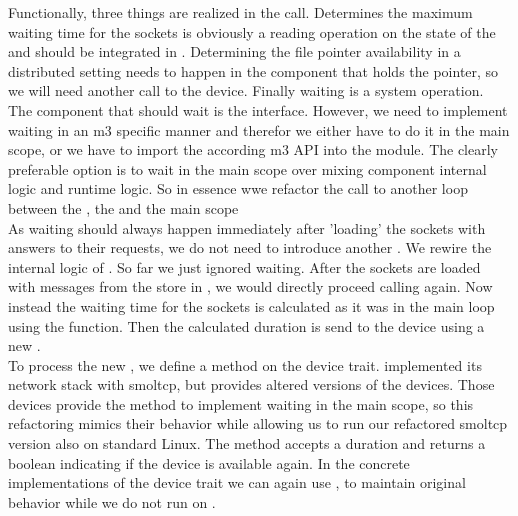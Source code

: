 Functionally, three things are realized in the  call. Determines the maximum waiting time for the sockets is obviously a reading operation on the state of the \stack{} and should be integrated in . Determining the file pointer availability in a distributed setting needs to happen in the component that holds the pointer, so we will need another call to the device. Finally waiting is a system operation. The component that should wait is the interface. However, we need to implement waiting in an m3 specific manner and therefor we either have to do it in the main scope, or we have to import the according m3 API into the  module. The clearly preferable option is to wait in the main scope over mixing component internal logic and runtime logic. So in essence wwe refactor the  call to another loop between the \stack{}, the \dev{} and the main scope\\

As waiting should always happen immediately after 'loading' the sockets with answers to their requests, we do not need to introduce another . We rewire the internal logic of . So far we just ignored waiting. After the sockets are loaded with messages from the store in , we would directly proceed calling  again. Now instead the waiting time for the sockets is calculated as it was in the main loop using the  function. Then the calculated duration is send to the device using a new . \\

To process the new , we define a method  on the device trait. \md implemented its network stack with smoltcp, but provides altered versions of the devices. Those devices provide the  method to implement waiting in the main scope, so this refactoring mimics their behavior while allowing us to run our refactored smoltcp version also on standard Linux. The method accepts a duration and returns a boolean indicating if the device is available again. In the concrete implementations of the device trait we can again use , to maintain original behavior while we do not run on \md. \\

